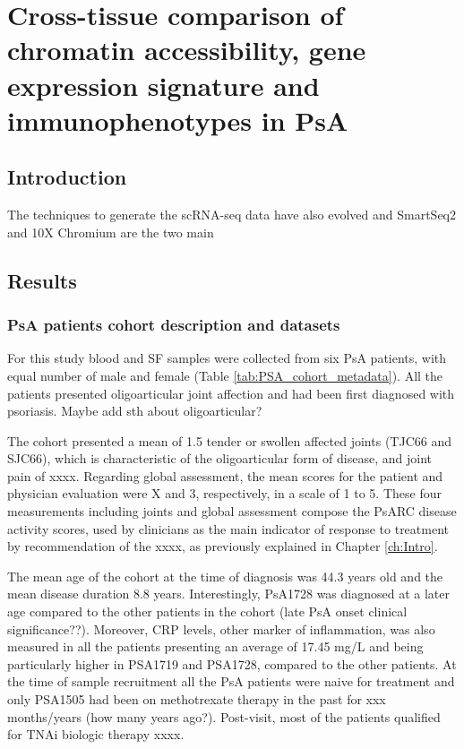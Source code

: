 \chapter{Cross-tissue comparison of chromatin accessibility, gene expression signature and immunophenotypes in PsA}
\label{ch:Results3}


\section{Introduction}
%
The techniques to generate the scRNA-seq data have also evolved and SmartSeq2 and 10X Chromium are the two main 
\section{Results}
%

\subsection{PsA patients cohort description and datasets}
For this study blood and SF samples were collected from six PsA patients, with equal number of male and female (Table \ref{tab:PSA_cohort_metadata}). All the patients presented oligoarticular joint affection and had been first diagnosed with psoriasis. Maybe add sth about oligoarticular?

The cohort presented a mean of 1.5 tender or swollen affected joints (TJC66 and SJC66), which is characteristic of the oligoarticular form of disease, and joint pain of xxxx. Regarding global assessment, the mean scores for the patient and physician evaluation were X and 3, respectively, in a scale of 1 to 5. These four measurements including joints and global assessment compose the PsARC disease activity scores, used by clinicians as the main indicator of response to treatment by recommendation of the xxxx, as previously explained in Chapter \ref{ch:Intro}. 

The mean age of the cohort at the time of diagnosis was 44.3 years old and the mean disease duration 8.8 years. Interestingly, PsA1728 was diagnosed at a later age compared to the other patients in the cohort (late PsA onset clinical significance??). Moreover, CRP levels, other marker of inflammation, was also measured in all the patients presenting an average of 17.45 mg/L and being particularly higher in PSA1719 and PSA1728, compared to the other patients. At the time of sample recruitment all the PsA patients were naive for treatment and only PSA1505 had been on methotrexate therapy in the past for xxx months/years (how many years ago?). Post-visit, most of the patients qualified for TNAi biologic therapy xxxx.


